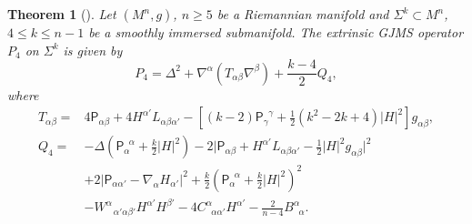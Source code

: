 \documentclass[11pt,letterpaper]{amsart}
\newcommand{\Sch}{\mathsf{P}}
\newtheorem{theorem}{Theorem}[section]
\theoremstyle{definition}
\theoremstyle{remark}
\numberwithin{equation}{section}
\begin{document}
\begin{theorem}[\cite{Case-Graham-Kuo}]
Let $(M^n,g)$, $n\geq 5$ be a Riemannian manifold and $\Sigma^k\subset M^n$, $4\leq k\leq n-1$ be a smoothly immersed submanifold. The extrinsic GJMS operator $P_4$ on $\Sigma^k$ is given by
    \begin{equation}
P_4=\Delta^2+\nabla^{\alpha}\left(T_{\alpha\beta}\nabla^{\beta}\right)+\frac{k-4}{2}Q_4,
    \end{equation}
where 
\begin{equation}
    \begin{split}
T_{\alpha\beta}=&4\Sch_{\alpha\beta}+4H^{\alpha'}L_{\alpha\beta\alpha'}-\left[(k-2)\Sch_{\gamma}^{\;\;\gamma}+\frac{1}{2}(k^2-2k+4)|H|^2\right]g_{\alpha\beta},\\
Q_4=&-\Delta \left(\Sch_{\alpha}^{\;\;\alpha}+\frac{k}{2}|H|^2\right)-2\big|\Sch_{\alpha\beta}+H^{\alpha'}L_{\alpha\beta\alpha'}-\frac{1}{2}|H|^2g_{\alpha\beta}\big|^2\\
&+2\big|\Sch_{\alpha\alpha'}-\nabla_{\alpha}H_{\alpha'}\big|^2+\frac{k}{2}\left(\Sch_{\alpha}^{\;\;\alpha}+\frac{k}{2}|H|^2\right)^2\\
&-W^{\alpha}_{\;\;\;\alpha'\alpha\beta'}H^{\alpha'}H^{\beta'}-4C^{\alpha}_{\;\; \alpha\alpha'}H^{\alpha'}-\frac{2}{n-4}B^{\alpha}_{\;\;\alpha}.
\end{split}
\end{equation}
\end{theorem}
\end{document}
